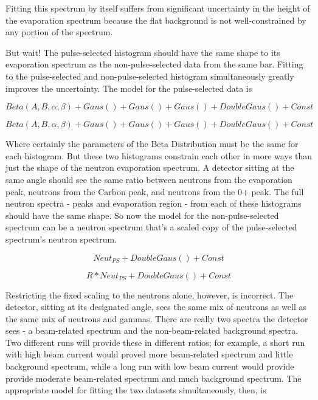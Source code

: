 Fitting this spectrum by itself suffers from significant uncertainty in the height of the evaporation spectrum because the flat background is not well-constrained by any portion of the spectrum.


But wait!  The pulse-selected histogram should have the same shape to its evaporation spectrum as the non-pulse-selected data from the same bar.  Fitting to the pulse-selected and non-pulse-selected histogram simultaneously greatly improves the uncertainty.  The model for the pulse-selected data is

\begin{equation}
Beta(A,B,\alpha,\beta) + Gaus() + Gaus() + Gaus() + DoubleGaus() + Const
\end{equation}

\begin{equation}
Beta(A,B,\alpha,\beta) + Gaus() + Gaus() + Gaus() + DoubleGaus() + Const
\end{equation}

Where certainly the parameters of the Beta Distribution must be the same for each histogram.  But these two histograms constrain each other in more ways than just the shape of the neutron evaporation spectrum.  A detector sitting at the same angle should see the same ratio between neutrons from the evaporation peak, neutrons from the Carbon peak, and neutrons from the 0+ peak.  The full neutron spectra - peaks and evaporation region - from each of these histograms should have the same shape.  So now the model for the non-pulse-selected spectrum can be a neutron spectrum that's a scaled copy of the pulse-selected spectrum's neutron spectrum.

\begin{equation}
Neut_{PS} + DoubleGaus() + Const
\end{equation}

\begin{equation}
R*Neut_{PS} + DoubleGaus() + Const
\end{equation}

Restricting the fixed scaling to the neutrons alone, however, is incorrect.  The detector, sitting at its designated angle, sees the same mix of neutrons as well as the same mix of neutrons and gammas.  There are really two spectra the detector sees - a beam-related spectrum and the non-beam-related background spectra.  Two different runs will provide these in different ratios; for example, a short run with high beam current would proved more beam-related spectrum and little background spectrum, while a long run with low beam current would provide provide moderate beam-related spectrum and much background spectrum.  The appropriate model for fitting the two datasets simultaneously, then, is

